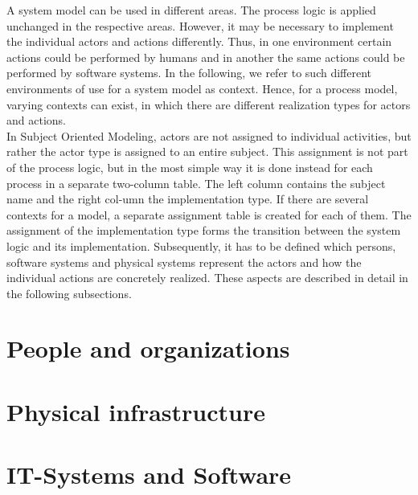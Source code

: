 A system model can be used in different areas. The process logic is applied unchanged in the respective areas. However, it may be necessary to implement the individual actors and actions differently. Thus, in one environment certain actions could be performed by humans and in another the same actions could be performed by software systems. In the following, we refer to such different environments of use for a system model as context. Hence, for a process model, varying contexts can exist, in which there are different realization types for actors and actions.\\ 
In Subject Oriented Modeling, actors are not assigned to individual activities, but rather the actor type is assigned to an entire subject. This assignment is not part of the process logic, but in the most simple way it is done instead for each process in a separate two-column table. The left column contains the subject name and the right col-umn the implementation type. If there are several contexts for a model, a separate assignment table is created for each of them.
The assignment of the implementation type forms the transition between the system logic and its implementation. Subsequently, it has to be defined which persons, software systems and physical systems represent the actors and how the individual actions are concretely realized. These aspects are described in detail in the following subsections.

\section{People and organizations}


\section{Physical infrastructure}

\section{IT-Systems and Software}

